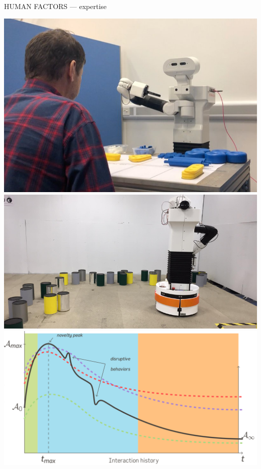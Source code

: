 \documentclass[xcolor=table]{beamer}
\begin{document}
\begin{frame}{HUMAN FACTORS --- expertise}

            \hyperlink{croquignole}{\includegraphics[height=0.2\paperheight]{trust/Tiago_and_participant}}
            \hspace{0.5em}
            \hyperlink{dominos}{\includegraphics[trim=10cm 0 4cm 0,clip,height=0.2\paperheight]{dynamic-language/Preview_image}}
            \hspace{0.5em}
            \hyperlink{anthropomorphism}{\includegraphics[height=0.2\paperheight]{dynamics_anthropo}}


\end{frame}
\end{document}
